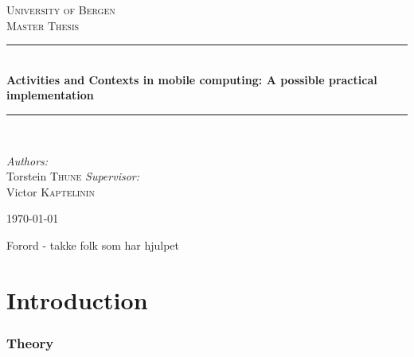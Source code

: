 \documentclass[a4paper]{article}
\newcommand{\HRule}{\rule{\linewidth}{0.5mm}}
\begin{document}
\begin{titlepage}

\begin{center}



\textsc{\LARGE University of Bergen}\\[1.5cm]

\textsc{\Large Master Thesis}\\[0.5cm]


\HRule \\[0.4cm]
{ \huge \bfseries Activities and Contexts in mobile computing: A possible practical implementation}\\[0.4cm]

\HRule \\[1.5cm]

\begin{minipage}{1\textwidth}
\begin{center} \large
\emph{Authors:}\\
Torstein \textsc{Thune}
\emph{Supervisor:}\\
Victor \textsc{Kaptelinin}
\end{center}
\end{minipage}


\vfill

{\large \today}

\end{center}

\end{titlepage}

\begin{abstract}


\end{abstract}
\newpage

Forord
- takke folk som har hjulpet

\newpage
\tableofcontents
\newpage

\part{Introduction}
\label{sec:introduction}


\section{Theory}
\end{document}
